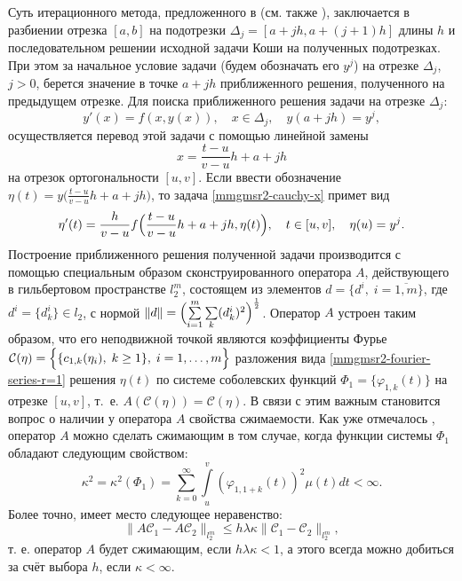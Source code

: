 Суть итерационного метода, предложенного в \cite{RamSharDemr} (см. также \cite{RamShaMag}), заключается в разбиении отрезка $[a,b]$ на подотрезки $\Delta_j=[a+jh,a+(j+1)h]$ длины $h$ и последовательном решении исходной задачи Коши на полученных подотрезках.
При этом за начальное условие задачи (будем обозначать его $y^j$) на отрезке $\Delta_j$, $j>0$, берется значение в точке $a+jh$ приближенного решения, полученного на предыдущем отрезке. Для поиска приближенного решения задачи на отрезке $\Delta_j$:
\begin{equation}\label{mmgmsr2-cauchy-x}
y'(x)=f(x,y(x)), \quad x \in \Delta_j, \quad y(a+jh)=y^j,
\end{equation}
осуществляется перевод этой задачи с помощью линейной замены
\begin{equation*}
x=\frac{t-u}{v-u}h+a+jh
\end{equation*}
на отрезок ортогональности $[u,v]$. Если ввести обозначение $\eta(t)=y\bigl(\frac{t-u}{v-u}h+a+jh\bigr)$, то задача \eqref{mmgmsr2-cauchy-x} примет вид
\begin{equation}\label{mmgmsr2-cauchy-problem-eta}
\eta'(t)=\frac{h}{v-u}f\Bigl(\frac{t-u}{v-u}h+a+jh,\eta(t)\Bigr), \quad t \in [u,v], \quad \eta(u)=y^j.
\end{equation}
Построение приближенного решения полученной задачи производится с помощью специальным образом сконструированного оператора $A$, действующего в гильбертовом пространстве $l^m_2$, состоящем из элементов $d=\{d^i,\; i=\overline{1,m}\}$, где $d^i=\{d^i_k\} \in l_2$, с нормой $\|d\|=\Bigl(\sum\limits_{i=1}^m \sum\limits_{k} (d_k^i)^2\Bigr)^{\frac{1}{2}}$.
Оператор $A$ устроен таким образом, что его неподвижной точкой являются коэффициенты Фурье $\mathcal{C}(\eta)=\Bigl\{ \{c_{1,k}(\eta_i), \; k \ge 1 \}, \; i = 1, \ldots, m \Bigr\}$ разложения вида \eqref{mmgmsr2-fourier-series-r=1} решения $\eta(t)$ по системе соболевских функций $\Phi_1=\{\varphi_{1,k}(t)\}$ на отрезке $[u,v]$, т.~е. $A(\mathcal{C}(\eta))=\mathcal{C}(\eta)$.
В связи с этим важным становится вопрос о наличии у оператора $A$ свойства сжимаемости.
Как уже отмечалось \cite{RamSharDemr}, оператор $A$ можно сделать сжимающим в том случае, когда функции системы $\Phi_1$ обладают следующим свойством:
\begin{equation}\label{mmgmsr2-finite-sum-prop}
\kappa^2=\kappa^2(\Phi_1)=
\sum\limits_{k=0}^{\infty}
\int\limits_{u}^{v}
(\varphi_{1,1+k}(t))^2 \mu(t)dt < \infty.
\end{equation}
Более точно, имеет место следующее неравенство:
\begin{equation*}
\|A\mathcal{C}_1 - A\mathcal{C}_2\|_{l_2^m} \le h \lambda \kappa \|\mathcal{C}_1-\mathcal{C}_2\|_{l_2^m},
\end{equation*}
т. е. оператор $A$ будет сжимающим, если $h \lambda \kappa < 1$, а этого всегда можно добиться за счёт выбора $h$, если $\kappa < \infty$.

